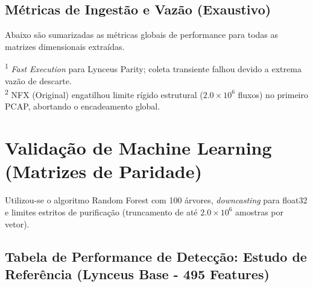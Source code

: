 \documentclass[11pt,a4paper]{article}
\begin{document}
\subsection{Métricas de Ingestão e Vazão (Exaustivo)}
Abaixo são sumarizadas as métricas globais de performance para todas as matrizes dimensionais extraídas.

\begin{table}[H]
\centering
{}
\caption{Resultados Globais de Performance.}
\end{table}

\noindent\small{\textsuperscript{1} \textit{Fast Execution} para Lynceus Parity; coleta transiente falhou devido a extrema vazão de descarte.} \\
\noindent\small{\textsuperscript{2} NFX (Original) engatilhou limite rígido estrutural ($2.0 \times 10^6$ fluxos) no primeiro PCAP, abortando o encadeamento global.}

\section{Validação de Machine Learning (Matrizes de Paridade)}

Utilizou-se o algoritmo Random Forest com 100 árvores, \textit{downcasting} para float32 e limites estritos de purificação (truncamento de até $2.0\times10^6$ amostras por vetor). 

\subsection{Tabela de Performance de Detecção: Estudo de Referência (Lynceus Base - 495 Features)}
\end{document}
